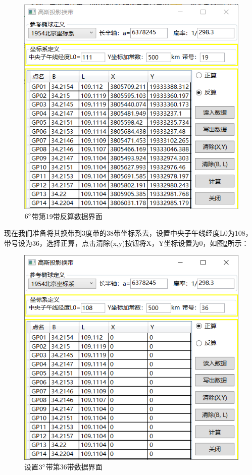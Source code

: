 \begin{figure}[htbp]
    \centering
    \includegraphics[scale=0.8]{chapter/gaussProj/UI04.png}
    \caption{$6^\circ$带第19带反算数据界面}
    \label{fig:GaussProjUI04}
\end{figure}

现在我们准备将其换带到3度带的38带坐标系去，设置中央子午线经度L0为108，
带号设为36，选择正算，点击清除(x,y)按钮将X，Y坐标设置为0，如图\ref{fig:GaussProjUI05}所示：

\begin{figure}[htbp]
    \centering
    \includegraphics[scale=0.8]{chapter/gaussProj/UI05.png}
    \caption{设置$3^\circ$带第36带数据界面}
    \label{fig:GaussProjUI05}
\end{figure}

